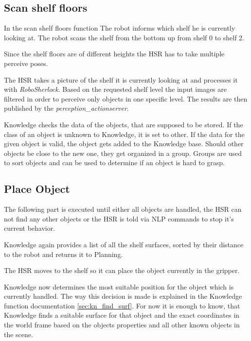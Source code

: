 \documentclass[main.tex]{subfiles}
\begin{document}
	
	\subsection{Scan shelf floors}
	
	In the scan shelf floors function
	The robot informs which shelf he is currently looking at. The robot scans the shelf from the bottom up from shelf 0 to shelf 2.
	
	Since the shelf floors are of different heights the HSR has to take multiple perceive poses.
	
	The HSR takes a picture of the shelf it is currently looking at and processes it with \textit{RoboSherlock}. Based on the requested shelf level the input images are filtered in order to perceive only objects in one specific level. The results are then published by the \textit{perception\_actionserver}.
	
	Knowledge checks the data of the objects, that are supposed to be stored. If the class of an object is unknown to Knowledge, it is set to other. If the data for the given object is valid, the object gets added to the Knowledge base. Should other objects be close to the new one, they get organized in a group. Groups are used to sort objects and can be used to determine if an object is hard to grasp.
	
	\subsection{Place Object}
	
	The following part is executed until either all objects are handled, the HSR can not find any other objects or the HSR is told via NLP commands to stop it's current behavior.
	
	Knowledge again provides a list of all the shelf surfaces, sorted by their distance to the robot and returns it to Planning.
	
	The HSR moves to the shelf so it can place the object currently in the gripper.
	
	Knowledge now determines the most suitable position for the object which is currently handled. The way this decision is made is explained in the Knowledge function documentation \ref{sec:kn_find_surf}. For now it is enough to know, that Knowledge finds a suitable surface for that object and the exact coordinates in the world frame based on the objects properties and all other known objects in the scene.
	
\end{document}
